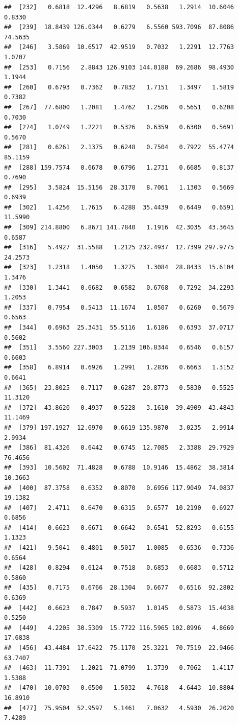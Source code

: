 \documentclass{article}\usepackage[]{graphicx}\usepackage[]{color}
\makeatletter
\newenvironment{kframe}{%
 \def\at@end@of@kframe{}%
 \ifinner\ifhmode%
  \def\at@end@of@kframe{\end{minipage}}%
  \begin{minipage}{\columnwidth}%
 \fi\fi%
 \def\FrameCommand##1{\hskip\@totalleftmargin \hskip-\fboxsep
 \colorbox{shadecolor}{##1}\hskip-\fboxsep
     \hskip-\linewidth \hskip-\@totalleftmargin \hskip\columnwidth}%
 \MakeFramed {\advance\hsize-\width
   \@totalleftmargin\z@ \linewidth\hsize
   \@setminipage}}%
 {\par\unskip\endMakeFramed%
 \at@end@of@kframe}
\newenvironment{knitrout}{}{} %
\makeatother
\begin{document}
\begin{knitrout}
\begin{kframe}
\begin{verbatim}
##  [232]   0.6818  12.4296   8.6819   0.5638   1.2914  10.6046   0.8330
##  [239]  18.8439 126.0344   0.6279   6.5560 593.7096  87.8086  74.5635
##  [246]   3.5869  10.6517  42.9519   0.7032   1.2291  12.7763   1.0707
##  [253]   0.7156   2.8843 126.9103 144.0188  69.2686  98.4930   1.1944
##  [260]   0.6793   0.7362   0.7832   1.7151   1.3497   1.5819   0.7382
##  [267]  77.6800   1.2081   1.4762   1.2506   0.5651   0.6208   0.7030
##  [274]   1.0749   1.2221   0.5326   0.6359   0.6300   0.5691   0.5670
##  [281]   0.6261   2.1375   0.6248   0.7504   0.7922  55.4774  85.1159
##  [288] 159.7574   0.6678   0.6796   1.2731   0.6685   0.8137   0.7690
##  [295]   3.5824  15.5156  28.3170   8.7061   1.1303   0.5669   0.6939
##  [302]   1.4256   1.7615   6.4288  35.4439   0.6449   0.6591  11.5990
##  [309] 214.8800   6.8671 141.7840   1.1916  42.3035  43.3645   0.6587
##  [316]   5.4927  31.5588   1.2125 232.4937  12.7399 297.9775  24.2573
##  [323]   1.2318   1.4050   1.3275   1.3084  28.8433  15.6104   1.3476
##  [330]   1.3441   0.6682   0.6582   0.6768   0.7292  34.2293   1.2053
##  [337]   0.7954   0.5413  11.1674   1.0507   0.6260   0.5679   0.6563
##  [344]   0.6963  25.3431  55.5116   1.6186   0.6393  37.0717   0.5602
##  [351]   3.5560 227.3003   1.2139 106.8344   0.6546   0.6157   0.6603
##  [358]   6.8914   0.6926   1.2991   1.2836   0.6663   1.3152   0.6641
##  [365]  23.8025   0.7117   0.6287  20.8773   0.5830   0.5525  11.3120
##  [372]  43.8620   0.4937   0.5228   3.1610  39.4909  43.4843  11.1469
##  [379] 197.1927  12.6970   0.6619 135.9870   3.0235   2.9914   2.9934
##  [386]  81.4326   0.6442   0.6745  12.7085   2.3388  29.7929  76.4656
##  [393]  10.5602  71.4828   0.6788  10.9146  15.4862  38.3814  10.3663
##  [400]  87.3758   0.6352   0.8070   0.6956 117.9049  74.0837  19.1382
##  [407]   2.4711   0.6470   0.6315   0.6577  10.2190   0.6927   0.6856
##  [414]   0.6623   0.6671   0.6642   0.6541  52.8293   0.6155   1.1323
##  [421]   9.5041   0.4801   0.5017   1.0085   0.6536   0.7336   0.6564
##  [428]   0.8294   0.6124   0.7518   0.6853   0.6683   0.5712   0.5860
##  [435]   0.7175   0.6766  28.1304   0.6677   0.6516  92.2802   0.6369
##  [442]   0.6623   0.7847   0.5937   1.0145   0.5873  15.4038   0.5250
##  [449]   4.2205  30.5309  15.7722 116.5965 102.8996   4.8669  17.6838
##  [456]  43.4484  17.6422  75.1170  25.3221  70.7519  22.9466  63.7407
##  [463]  11.7391   1.2021  71.0799   1.3739   0.7062   1.4117   1.5388
##  [470]  10.0703   0.6500   1.5032   4.7618   4.6443  10.8804  16.8910
##  [477]  75.9504  52.9597   5.1461   7.0632   4.5930  26.2020   7.4289

\end{verbatim}
\end{kframe}
\end{knitrout}
\end{document}
